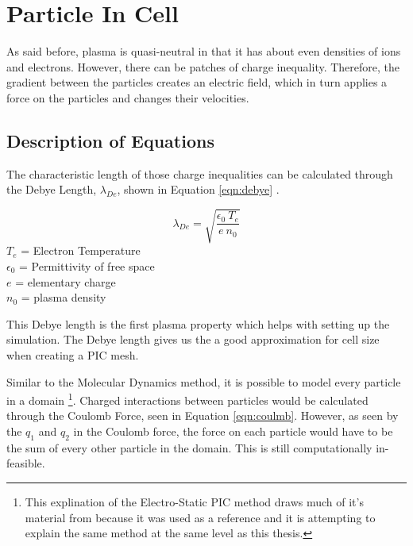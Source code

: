 \section{Particle In Cell}

As said before, plasma is quasi-neutral in that it has about even densities of ions and electrons. However, there can be patches of charge inequality. Therefore, the gradient between the particles creates an electric field, which in turn applies a force on the particles and changes their velocities. \par


\subsection{Description of Equations}

The characteristic length of those charge inequalities can be calculated through the Debye Length, \(\lambda_{De}\), shown in Equation \ref{eqn:debye} \cite{debye}. \par


\begin{equation}
    \label{eqn:debye}
    \lambda_{De} = \sqrt{\frac{\epsilon_0 \: T_e}{e \: n_0}}
\end{equation}
\(T_e\) = Electron Temperature \\
\(\epsilon_0\) = Permittivity of free space \\
\(e\) = elementary charge \\
\(n_0\) = plasma density \par

\indent This Debye length is the first plasma property which helps with setting up the simulation. The Debye length gives us the a good approximation for cell size when creating a PIC mesh. \par 

\indent Similar to the Molecular Dynamics method, it is possible to model every particle in a domain \footnote{This explination of the Electro-Static PIC method draws much of it's material from \cite{es-pic} because it was used as a reference and it is attempting to explain the same method at the same level as this thesis.}. Charged interactions between particles would be calculated through the Coulomb Force, seen in Equation \ref{eqn:coulmb}. However, as seen by the \(q_1\) and \(q_2\) in the Coulomb force, the force on each particle would have to be the sum of every other particle in the domain. This is still computationally in-feasible. \par 

